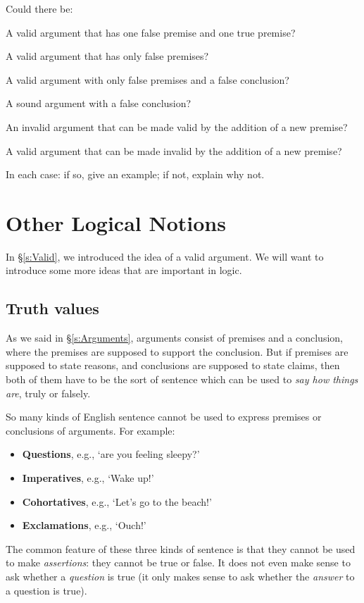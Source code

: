 \problempart
\label{pr.EnglishCombinations}
Could there be:
	\begin{earg}
		\item A valid argument that has one false premise and one true premise?
		\item A valid argument that has only false premises?
		\item A valid argument with only false premises and a false conclusion?
		\item A sound argument with a false conclusion?
		\item An invalid argument that can be made valid by the addition of a new premise?
		\item A valid argument that can be made invalid by the addition of a new premise?
	\end{earg}
In each case: if so, give an example; if not, explain why not.


\chapter{Other Logical Notions}\label{s:BasicNotions}

In §\ref{s:Valid}, we introduced the idea of a valid argument. We will want to introduce some more ideas that are important in logic.

\section{Truth values}\label{s:truthvalues}
As we said in §\ref{s:Arguments}, arguments consist of premises and a conclusion, where the premises are supposed to support the conclusion. But if premises are supposed to state reasons, and conclusions are supposed to state claims, then both of them have to be the sort of sentence which can be used to \emph{say how things are}, truly or falsely. 

So many kinds of English sentence cannot be used to express premises or conclusions of arguments. For example:
	\begin{itemize}
		\item \textbf{Questions}, e.g., `are you feeling sleepy?'
		\item \textbf{Imperatives}, e.g., `Wake up!'
		\item \textbf{Cohortatives}, e.g., `Let's go to the beach!'
		\item \textbf{Exclamations}, e.g., `Ouch!'
	\end{itemize}
The common feature of these three kinds of sentence is that they cannot be used to make \emph{assertions}: they cannot be true or false. It does not even make sense to ask whether a \emph{question} is true (it only makes sense to ask whether the \emph{answer} to a question is true).

